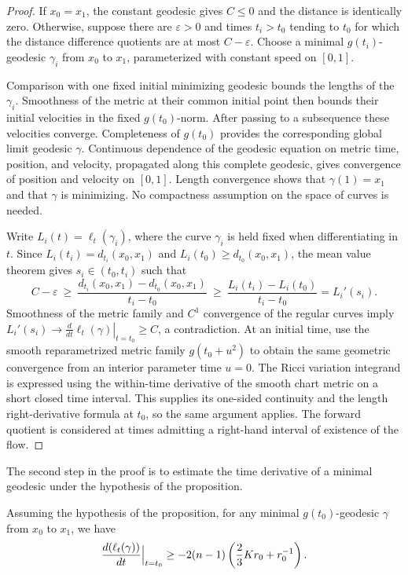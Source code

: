 \begin{proof}
\sketch If $x_0=x_1$, the constant geodesic gives $C\leq 0$ and the
distance is identically zero. Otherwise, suppose there are $\varepsilon>0$
and times $t_i>t_0$ tending to $t_0$ for which the distance difference quotients
are at most $C-\varepsilon$. Choose a minimal $g(t_i)$-geodesic $\gamma_i$
from $x_0$ to $x_1$, parameterized with constant speed on $[0,1]$.

Comparison with one fixed initial minimizing geodesic bounds the lengths
of the $\gamma_i$. Smoothness of the metric at their common initial point
then bounds their initial velocities in the fixed $g(t_0)$-norm.
After passing to a subsequence these velocities converge. Completeness of
$g(t_0)$ provides the corresponding global limit geodesic $\gamma$.
Continuous dependence of the geodesic equation on metric time, position,
and velocity, propagated along this complete geodesic, gives convergence
of position and velocity on $[0,1]$. Length convergence shows that
$\gamma(1)=x_1$ and that $\gamma$ is minimizing. No compactness assumption
on the space of curves is needed.

Write $L_i(t)=\ell_t(\gamma_i)$, where the curve $\gamma_i$ is held
fixed when differentiating in $t$. Since
$L_i(t_i)=d_{t_i}(x_0,x_1)$ and $L_i(t_0)\geq d_{t_0}(x_0,x_1)$,
the mean value theorem gives $s_i\in(t_0,t_i)$ such that
\[
 C-\varepsilon\ \geq\
 \frac{d_{t_i}(x_0,x_1)-d_{t_0}(x_0,x_1)}{t_i-t_0}
 \ \geq\ \frac{L_i(t_i)-L_i(t_0)}{t_i-t_0}
 =L_i'(s_i).
\]
Smoothness of the metric family and $C^1$ convergence of the regular
curves imply $L_i'(s_i)\to
\left.\frac{d}{dt}\ell_t(\gamma)\right|_{t=t_0}\geq C$, a contradiction.
At an initial time, use the smooth reparametrized metric family
$g(t_0+u^2)$ to obtain the same geometric convergence from an interior
parameter time $u=0$. The Ricci variation integrand is expressed using
the within-time derivative of the smooth chart metric on a short closed
time interval. This supplies its one-sided continuity and the length
right-derivative formula at $t_0$, so the same argument applies.
The forward quotient is considered at times admitting a right-hand
interval of existence of the flow.
\end{proof}



The second step in the proof is to estimate the time derivative of a
minimal geodesic under the hypothesis of the proposition.

\begin{claim}[Minimal geodesic time derivative]\label{claim:minimal-geodesic-time-derivative}
\uses{def:geodesic}
\leanok
\label{3.23}

Assuming the hypothesis of the proposition, for any
 minimal $g(t_0)$-geodesic $\gamma$ from $x_0$ to $x_1$, we have
$$\frac{d(\ell_t(\gamma))}{dt}\Bigl|_{t=t_0}\Bigr.\ge -2(n-1)
\left(\frac{2}{3}Kr_0+r_0^{-1}\right).$$
\end{claim}

